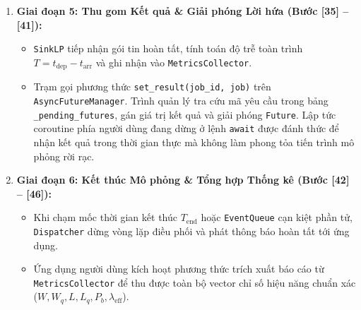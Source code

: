 \begin{enumerate}[leftmargin=2em, itemsep=6pt]
\item \textbf{Giai đoạn 5: Thu gom Kết quả \& Giải phóng Lời hứa (Bước [35] -- [41]):}
\begin{itemize}[leftmargin=1.5em, itemsep=2pt]
\item \texttt{SinkLP} tiếp nhận gói tin hoàn tất, tính toán độ trễ toàn trình $T = t_{\text{dep}} - t_{\text{arr}}$ và ghi nhận vào \texttt{MetricsCollector}.
\item Trạm gọi phương thức \texttt{set\_result(job\_id, job)} trên \texttt{AsyncFutureManager}. Trình quản lý tra cứu mã yêu cầu trong bảng \texttt{\_pending\_futures}, gán giá trị kết quả và giải phóng \texttt{Future}. Lập tức coroutine phía người dùng đang dừng ở lệnh \texttt{await} được đánh thức để nhận kết quả trong thời gian thực mà không làm phong tỏa tiến trình mô phỏng rời rạc.
\end{itemize}

\item \textbf{Giai đoạn 6: Kết thúc Mô phỏng \& Tổng hợp Thống kê (Bước [42] -- [46]):}
\begin{itemize}[leftmargin=1.5em, itemsep=2pt]
\item Khi chạm mốc thời gian kết thúc $T_{\text{end}}$ hoặc \texttt{EventQueue} cạn kiệt phần tử, \texttt{Dispatcher} dừng vòng lặp điều phối và phát thông báo hoàn tất tới ứng dụng.
\item Ứng dụng người dùng kích hoạt phương thức trích xuất báo cáo từ \texttt{MetricsCollector} để thu được toàn bộ vector chỉ số hiệu năng chuẩn xác ($W, W_q, L, L_q, P_b, \lambda_{\text{eff}}$).
\end{itemize}
\end{enumerate}

